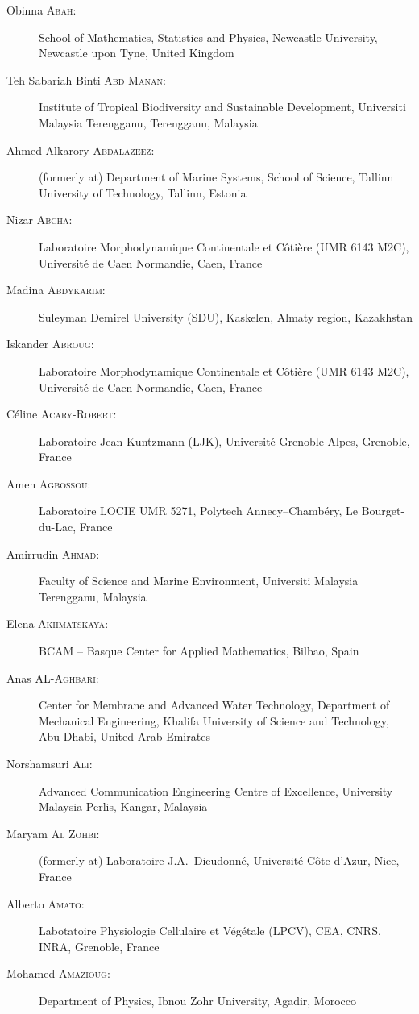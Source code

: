 \documentclass[final, a4paper, oneside, 12pt]{article}
\numberwithin{equation}{section}
\begin{document}
\begin{description}
  \item[Obinna \textsc{Abah}:] School of Mathematics, Statistics and Physics, Newcastle University, Newcastle upon Tyne, United Kingdom
  \item[Teh Sabariah Binti \textsc{Abd Manan}:] Institute of Tropical Biodiversity and Sustainable Development, Universiti Malaysia Terengganu, Terengganu, Malaysia
  \item[Ahmed Alkarory \textsc{Abdalazeez}:] (formerly at) Department of Marine Systems, School of Science, Tallinn University of Technology, Tallinn, Estonia
  \item[Nizar \textsc{Abcha}:] Laboratoire Morphodynamique Continentale et C\^oti\`ere (UMR 6143 M2C), Universit\'e de Caen Normandie, Caen, France
  \item[Madina \textsc{Abdykarim}:] Suleyman Demirel University (SDU), Kaskelen, Almaty region, Kazakhstan
  \item[Iskander \textsc{Abroug}:] Laboratoire Morphodynamique Continentale et C\^oti\`ere (UMR 6143 M2C), Universit\'e de Caen Normandie, Caen, France
  \item[C\'eline \textsc{Acary-Robert}:] Laboratoire Jean Kuntzmann (LJK), Universit\'e Grenoble Alpes, Grenoble, France
  \item[Amen \textsc{Agbossou}:] Laboratoire LOCIE UMR 5271, Polytech Annecy--Chamb\'ery, Le Bourget-du-Lac, France
  \item[Amirrudin \textsc{Ahmad}:] Faculty of Science and Marine Environment, Universiti Malaysia Terengganu, Malaysia
  \item[Elena \textsc{Akhmatskaya}:] BCAM -- Basque Center for Applied Mathematics, Bilbao, Spain
  \item[Anas \textsc{AL-Aghbari}:] Center for Membrane and Advanced Water Technology, Department of Mechanical Engineering, Khalifa University of Science and Technology, Abu Dhabi, United Arab Emirates
  \item[Norshamsuri \textsc{Ali}:] Advanced Communication Engineering Centre of Excellence, University Malaysia Perlis, Kangar, Malaysia
  \item[Maryam \textsc{Al Zohbi}:] (formerly at) Laboratoire J.A.~Dieudonn\'e, Universit\'e C\^ote d'Azur, Nice, France
  \item[Alberto \textsc{Amato}:] Labotatoire Physiologie Cellulaire et V\'eg\'etale (LPCV), CEA, CNRS, INRA, Grenoble, France
  \item[Mohamed \textsc{Amazioug}:] Department of Physics, Ibnou Zohr University, Agadir, Morocco

\end{description}
\end{document}
